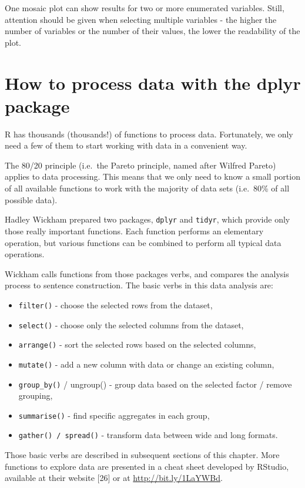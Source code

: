 \documentclass[]{book}
\theoremstyle{definition}
\theoremstyle{definition}
\theoremstyle{definition}
\theoremstyle{remark}
\begin{document}
One mosaic plot can show results for two or more enumerated variables.
Still, attention should be given when selecting multiple variables - the
higher the number of variables or the number of their values, the lower
the readability of the plot.

\section{How to process data with the dplyr package}\label{part_25}

R has thousands (thousands!) of functions to process data. Fortunately,
we only need a few of them to start working with data in a convenient
way.

The 80/20 principle (i.e.~the Pareto principle, named after Wilfred
Pareto) applies to data processing. This means that we only need to know
a small portion of all available functions to work with the majority of
data sets (i.e.~80\% of all possible data).

Hadley Wickham prepared two packages, \texttt{dplyr} and \texttt{tidyr},
which provide only those really important functions. Each function
performs an elementary operation, but various functions can be combined
to perform all typical data operations.

Wickham calls functions from those packages verbs, and compares the
analysis process to sentence construction. The basic verbs in this data
analysis are:

\begin{itemize}
\item
  \texttt{filter()} - choose the selected rows from the dataset,
\item
  \texttt{select()} - choose only the selected columns from the dataset,
\item
  \texttt{arrange()} - sort the selected rows based on the selected
  columns,
\item
  \texttt{mutate()} - add a new column with data or change an existing
  column,
\item
  \texttt{group\_by()} / ungroup() - group data based on the selected
  factor / remove grouping,
\item
  \texttt{summarise()} - find specific aggregates in each group,
\item
  \texttt{gather()\ /\ spread()} - transform data between wide and long
  formats.
\end{itemize}

Those basic verbs are described in subsequent sections of this chapter.
More functions to explore data are presented in a cheat sheet developed
by RStudio, available at their website {[}26{]} or at
\url{http://bit.ly/1LaYWBd}.
\end{document}
